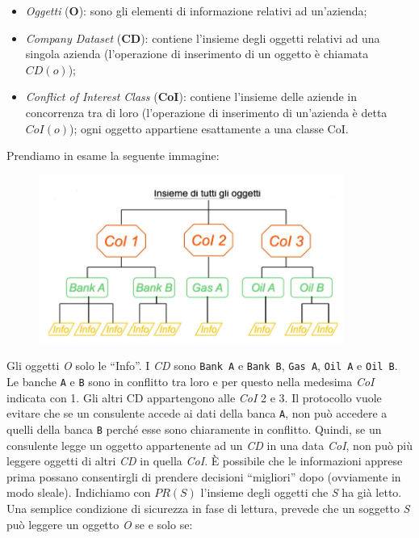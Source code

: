 \begin{itemize}
      \item \textit{Oggetti} (\textbf{O}): sono gli elementi di informazione
            relativi ad un'azienda;
      \item \textit{Company Dataset} (\textbf{CD}): contiene l'insieme degli
            oggetti relativi ad una singola azienda
            (l'operazione di inserimento di un oggetto è chiamata \(CD(o)\));
      \item \textit{Conflict of Interest Class} (\textbf{CoI}): contiene
            l'insieme delle aziende in concorrenza tra di
            loro (l'operazione di inserimento di un'azienda è detta \(CoI(o)\));
            ogni oggetto appartiene
            esattamente a una classe CoI.
\end{itemize}

Prendiamo in esame la seguente immagine:

\begin{figure}[H]
      \centering
      \includegraphics[width=10cm, keepaspectratio]{capitoli/policy/imgs/chinese1.png}
\end{figure}

Gli oggetti \textit{O} solo le “Info”. I \textit{CD} sono \verb|Bank A|
e \verb|Bank B|, \verb|Gas A|, \verb|Oil A| e \verb|Oil B|.
Le banche \verb|A| e \verb|B| sono
in conflitto tra loro e per questo nella
medesima \textit{CoI} indicata con 1. Gli altri CD
appartengono alle \textit{CoI} 2 e 3.
Il protocollo vuole evitare che se un
consulente accede ai dati della banca \verb|A|, non
può accedere a quelli della banca \verb|B| perché
esse sono chiaramente in conflitto.
Quindi, se un consulente legge un oggetto appartenente ad un \textit{CD} in una
data \textit{CoI}, non può più
leggere oggetti di altri \textit{CD} in quella \textit{CoI}.
È possibile che le informazioni apprese prima possano consentirgli di prendere
decisioni “migliori” dopo (ovviamente in modo sleale).
Indichiamo con \(PR(S)\) l'insieme degli oggetti che \textit{S} ha già letto.
Una semplice condizione di sicurezza in fase di lettura, prevede che un soggetto
\textit{S} può leggere un
oggetto \textit{O} se e solo se:

